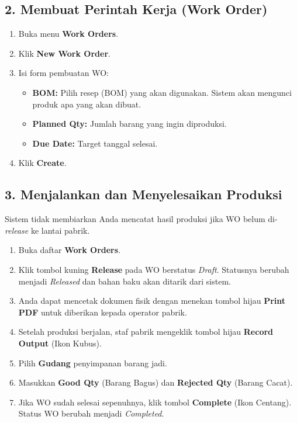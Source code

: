 \subsection{2. Membuat Perintah Kerja (Work Order)}
\begin{enumerate}
    \item Buka menu \textbf{Work Orders}.
    \item Klik \textbf{New Work Order}.
    \item Isi form pembuatan WO:
    \begin{itemize}
        \item \textbf{BOM:} Pilih resep (BOM) yang akan digunakan. Sistem akan mengunci produk apa yang akan dibuat.
        \item \textbf{Planned Qty:} Jumlah barang yang ingin diproduksi.
        \item \textbf{Due Date:} Target tanggal selesai.
    \end{itemize}
    \item Klik \textbf{Create}.
\end{enumerate}

\subsection{3. Menjalankan dan Menyelesaikan Produksi}
Sistem tidak membiarkan Anda mencatat hasil produksi jika WO belum di-\textit{release} ke lantai pabrik.
\begin{enumerate}
    \item Buka daftar \textbf{Work Orders}.
    \item Klik tombol kuning \textbf{Release} pada WO berstatus \textit{Draft}. Statusnya berubah menjadi \textit{Released} dan bahan baku akan ditarik dari sistem.
    \item Anda dapat mencetak dokumen fisik dengan menekan tombol hijau \textbf{Print PDF} untuk diberikan kepada operator pabrik.
    \item Setelah produksi berjalan, staf pabrik mengeklik tombol hijau \textbf{Record Output} (Ikon Kubus).
    \item Pilih \textbf{Gudang} penyimpanan barang jadi.
    \item Masukkan \textbf{Good Qty} (Barang Bagus) dan \textbf{Rejected Qty} (Barang Cacat).
    \item Jika WO sudah selesai sepenuhnya, klik tombol \textbf{Complete} (Ikon Centang). Status WO berubah menjadi \textit{Completed}.
\end{enumerate}


